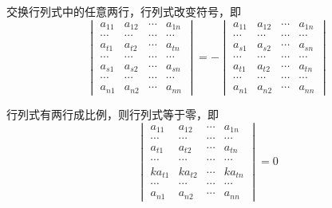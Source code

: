 \begin{property}
    交换行列式中的任意两行，行列式改变符号，即
    \[
        \begin{vmatrix}
            a_{11} & a_{12} & \cdots & a_{1n} \\
            \cdots & \cdots & \cdots & \cdots \\
            a_{t1} & a_{t2} & \cdots & a_{tn} \\
            \cdots & \cdots & \cdots & \cdots \\
            a_{s1} & a_{s2} & \cdots & a_{sn} \\
            \cdots & \cdots & \cdots & \cdots \\
            a_{n1} & a_{n2} & \cdots & a_{nn}
        \end{vmatrix}
        = -
        \begin{vmatrix}
            a_{11} & a_{12} & \cdots & a_{1n} \\
            \cdots & \cdots & \cdots & \cdots \\
            a_{s1} & a_{s2} & \cdots & a_{sn} \\
            \cdots & \cdots & \cdots & \cdots \\
            a_{t1} & a_{t2} & \cdots & a_{tn} \\
            \cdots & \cdots & \cdots & \cdots \\
            a_{n1} & a_{n2} & \cdots & a_{nn}
        \end{vmatrix}
    \]
\end{property}

\begin{property}
    行列式有两行成比例，则行列式等于零，即
    \[
        \begin{vmatrix}
            a_{11}  & a_{12}  & \cdots & a_{1n}  \\
            \cdots  & \cdots  & \cdots & \cdots  \\
            a_{t1}  & a_{t2}  & \cdots & a_{tn}  \\
            \cdots  & \cdots  & \cdots & \cdots  \\
            ka_{t1} & ka_{t2} & \cdots & ka_{tn} \\
            \cdots  & \cdots  & \cdots & \cdots  \\
            a_{n1}  & a_{n2}  & \cdots & a_{nn}
        \end{vmatrix}
        =
        0
    \]
\end{property}

